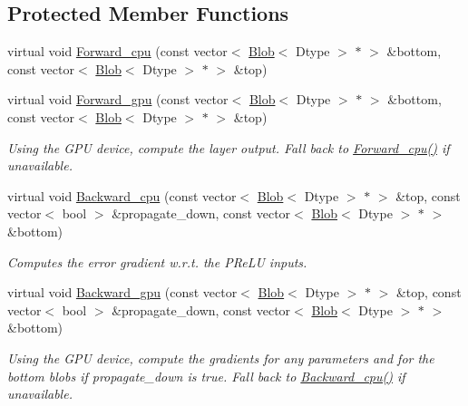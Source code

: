 \subsection*{Protected Member Functions}
\begin{DoxyCompactItemize}
\item 
virtual void \hyperlink{classcaffe_1_1PReLULayer_a67128902b4ef419ccfb23db2d49b9ace}{Forward\+\_\+cpu} (const vector$<$ \hyperlink{classcaffe_1_1Blob}{Blob}$<$ Dtype $>$ $\ast$ $>$ \&bottom, const vector$<$ \hyperlink{classcaffe_1_1Blob}{Blob}$<$ Dtype $>$ $\ast$ $>$ \&top)
\item 
virtual void \hyperlink{classcaffe_1_1PReLULayer_af0807c358c94f9947dc42876eca413ce}{Forward\+\_\+gpu} (const vector$<$ \hyperlink{classcaffe_1_1Blob}{Blob}$<$ Dtype $>$ $\ast$ $>$ \&bottom, const vector$<$ \hyperlink{classcaffe_1_1Blob}{Blob}$<$ Dtype $>$ $\ast$ $>$ \&top)\hypertarget{classcaffe_1_1PReLULayer_af0807c358c94f9947dc42876eca413ce}{}\label{classcaffe_1_1PReLULayer_af0807c358c94f9947dc42876eca413ce}

\begin{DoxyCompactList}\small\item\em Using the G\+PU device, compute the layer output. Fall back to \hyperlink{classcaffe_1_1PReLULayer_a67128902b4ef419ccfb23db2d49b9ace}{Forward\+\_\+cpu()} if unavailable. \end{DoxyCompactList}\item 
virtual void \hyperlink{classcaffe_1_1PReLULayer_a29a2da9c4d5efdb81e26663d17ca7ce9}{Backward\+\_\+cpu} (const vector$<$ \hyperlink{classcaffe_1_1Blob}{Blob}$<$ Dtype $>$ $\ast$ $>$ \&top, const vector$<$ bool $>$ \&propagate\+\_\+down, const vector$<$ \hyperlink{classcaffe_1_1Blob}{Blob}$<$ Dtype $>$ $\ast$ $>$ \&bottom)
\begin{DoxyCompactList}\small\item\em Computes the error gradient w.\+r.\+t. the P\+Re\+LU inputs. \end{DoxyCompactList}\item 
virtual void \hyperlink{classcaffe_1_1PReLULayer_a16ab90570492b7e74faae68a0ee986bb}{Backward\+\_\+gpu} (const vector$<$ \hyperlink{classcaffe_1_1Blob}{Blob}$<$ Dtype $>$ $\ast$ $>$ \&top, const vector$<$ bool $>$ \&propagate\+\_\+down, const vector$<$ \hyperlink{classcaffe_1_1Blob}{Blob}$<$ Dtype $>$ $\ast$ $>$ \&bottom)\hypertarget{classcaffe_1_1PReLULayer_a16ab90570492b7e74faae68a0ee986bb}{}\label{classcaffe_1_1PReLULayer_a16ab90570492b7e74faae68a0ee986bb}

\begin{DoxyCompactList}\small\item\em Using the G\+PU device, compute the gradients for any parameters and for the bottom blobs if propagate\+\_\+down is true. Fall back to \hyperlink{classcaffe_1_1PReLULayer_a29a2da9c4d5efdb81e26663d17ca7ce9}{Backward\+\_\+cpu()} if unavailable. \end{DoxyCompactList}\end{DoxyCompactItemize}
